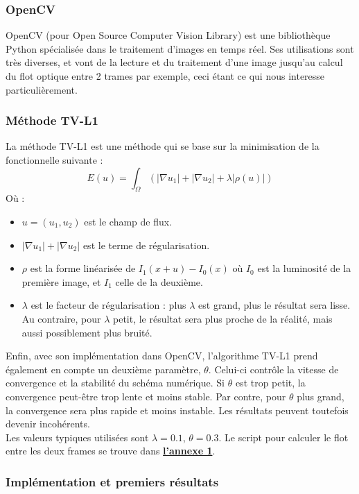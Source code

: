\documentclass{magnolia}
\begin{document}
\subsubsection{OpenCV}
OpenCV (pour Open Source Computer Vision Library) est une bibliothèque Python spécialisée dans le traitement d'images en temps réel. Ses utilisations sont très diverses, et vont de la lecture et du traitement d'une image jusqu'au calcul du flot optique entre 2 trames par exemple, ceci étant ce qui nous interesse particulièrement.
\subsubsection{Méthode TV-L1}

La méthode TV-L1 \cite{tvl} est une méthode qui se base sur la minimisation de la fonctionnelle suivante :
\[ E(u)=\int_\Omega\left( \left| \nabla u_1 \right|+\left| \nabla u_2\right|+ \lambda\left| \rho(u)\right|\right)\]
Où :
\begin{itemize}
    \item $u=(u_1,u_2)$ est le champ de flux.
    \item $\left| \nabla u_1 \right|+\left| \nabla u_2\right|$ est le terme de régularisation.
    \item $\rho$ est la forme linéarisée de $I_1(x+u)-I_0(x)$ où $I_0$ est la luminosité de la première image, et $I_1$ celle de la deuxième.
    \item $\lambda$ est le facteur de régularisation : plus $\lambda$ est grand, plus le résultat sera lisse. Au contraire, pour $\lambda$ petit, le résultat sera plus proche de la réalité, mais aussi possiblement plus bruité.
\end{itemize}
Enfin, avec son implémentation dans OpenCV, l'algorithme TV-L1 prend également en compte un deuxième paramètre, $\theta$. Celui-ci contrôle la vitesse de convergence et la stabilité du schéma numérique. Si $\theta$ est trop petit, la convergence peut-être trop lente et moins stable. Par contre, pour $\theta$ plus grand, la convergence sera plus rapide et moins instable. Les résultats peuvent toutefois devenir incohérents.\\
Les valeurs typiques utilisées sont $\lambda=0.1$, $\theta=0.3$. Le script pour calculer le flot entre les deux frames se trouve dans \textbf{\hyperref[annexe:tvl]{l'annexe 1}}.

\subsubsection{Implémentation et premiers résultats}
\end{document}
